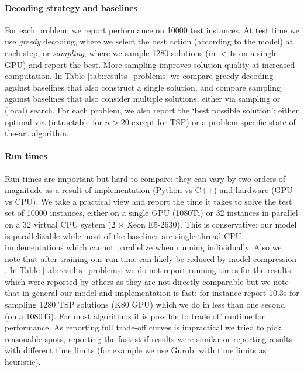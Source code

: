 \paragraph{Decoding strategy and baselines}
For each problem, we report performance on 10000 test instances.
At test time we use \emph{greedy} decoding, where we select the best action (according to the model) at each step, or \emph{sampling}, where we sample 1280 solutions (in $<1$s on a single GPU) and report the best. More sampling improves solution quality at increased computation.
In Table \ref{tab:results_problems} we compare greedy decoding against baselines that also construct a single solution, and compare sampling against baselines that also consider multiple solutions, either via sampling or (local) search. For each problem, we also report the `best possible solution': either optimal via  (intractable for $n > 20$ except for TSP) or a problem specific state-of-the-art algorithm.

\paragraph{Run times}
Run times are important but hard to compare: they can vary by two orders of magnitude as a result of implementation (Python vs C++) and hardware (GPU vs CPU). We take a practical view and report the time it takes to solve the test set of 10000 instances, either on a single GPU (1080Ti) or 32 instances in parallel on a 32 virtual CPU system (2 $\times$ Xeon E5-2630). This is conservative: our model is parallelizable while most of the baselines are single thread CPU implementations which cannot parallelize when running individually. Also we note that after training our run time can likely be reduced by model compression \citep{hinton2015distilling}. In Table \ref{tab:results_problems} we do not report running times for the results which were reported by others as they are not directly comparable but we note that in general our model and implementation is fast: for instance \citet{bello2016neural} report 10.3s for sampling 1280 TSP solutions (K80 GPU) which we do in less than one second (on a 1080Ti). For most algorithms it is possible to trade off runtime for performance. As reporting full trade-off curves is impractical we tried to pick reasonable spots, reporting the fastest if results were similar or reporting results with different time limits (for example we use Gurobi with time limits as heuristic).


